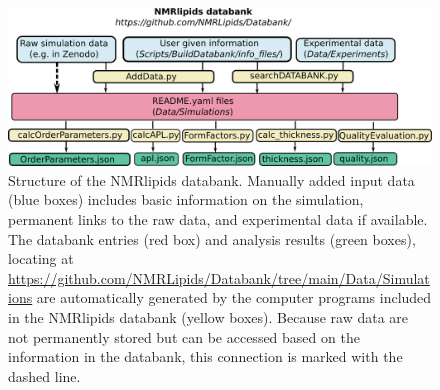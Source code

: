 \documentclass[fleqn,10pt]{wlscirep}
\begin{document}
\begin{figure}[!h]
  \includegraphics[width=\textwidth]{Figures/DataBankChart.pdf}
  \caption{Structure of the NMRlipids databank. Manually added input data (blue boxes) includes basic information on the simulation, permanent links to the raw data, and experimental data if available. The databank entries (red box) and analysis results (green boxes), locating at \url{https://github.com/NMRLipids/Databank/tree/main/Data/Simulations} are automatically generated by the computer programs included in the NMRlipids databank (yellow boxes). Because raw data are not permanently stored but can be accessed based on the information in the databank, this connection is marked with the dashed line.}
  \label{DatabankStructure}
\end{figure}
\end{document}
